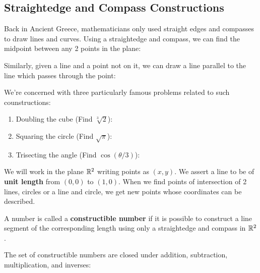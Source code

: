 \subsection{Straightedge and Compass Constructions}

Back in Ancient Greece, mathematicians only used straight edges and compasses to
draw lines and curves. Using a straightedge and compass, we can find the midpoint
between any 2 points in the plane:

\centering
{}
\flushleft

Similarly, given a line and a point not on it, we can draw a line parallel to
the line which passes through the point:

\centering
{}
\flushleft

We're concerned with three particularly famous problems related to such
counstructions:
\begin{enumerate}[ ]
    \item Doubling the cube (Find $ \sqrt[3]{2} $):
        
        \centering
        \flushleft
        
    \item Squaring the circle (Find $ \sqrt{\pi} $):
        
        \centering
        \flushleft
        
    \item Trisecting the angle (Find $ \cos (\theta/3) $):
        
        \centering
        \flushleft
        
\end{enumerate}
We will work in the plane $ \mathbb{R}^{2} $ writing points as $ (x, y) $.
We assert a line to be of \textbf{unit length} from $ (0, 0) $ to $ (1, 0) $.
When we find points of intersection of 2 lines, circles or a line and circle,
we get new points whose coordinates can be described.
\begin{defn}
    A number is called a \textbf{constructible number} if it is possible to
    construct a line segment of the corresponding length using only a
    straightedge and compass in $ \mathbb{R}^{2} $.
\end{defn}
The set of constructible numbers are closed under addition, subtraction,
multiplication, and inverses:

